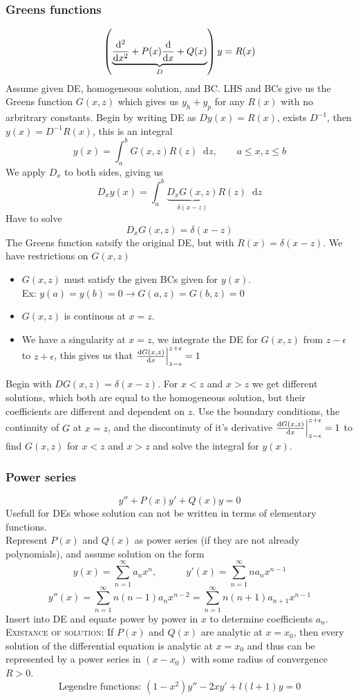 \documentclass[a4paper, 10pt]{article}
\newcommand*\diff{\mathop{}\!\mathrm{d}}
\begin{document}
\begin{multicols*}{3}
\subsubsection*{\small Greens functions}
$$ \left(\underbrace{\dv[2]{}{x} + P(x)\dv{}{x} + Q(x)}_{D}\right)y = R(x) $$
Assume given DE, homogeneous solution, and BC. LHS and BCs give us the Greens function $G(x,z)$ which gives us $y_h + y_p$ for any $R(x)$ with no arbritrary constants. Begin by writing DE as $Dy(x)=R(x)$, exists $D^{-1}$, then $y(x) = D^{-1}R(x)$, this is an integral $$y(x) = \int_a^b G(x,z)R(z)\diff z, \qquad a \leq x, z \leq b$$
We apply $D_x$ to both sides, giving us
$$D_xy(x) = \int_a^b \underbrace{D_xG(x,z)}_{\delta(x-z)}R(z)\diff z$$
Have to solve
$$ D_xG(x,z) = \delta(x-z)$$
The Greens function satsify the original DE, but with $R(x) = \delta(x-z)$. We have restrictions on $G(x,z)$
\begin{itemize}
  \item $G(x,z)$ must satisfy the given BCs given for $y(x)$.\\ Ex: $y(a)=y(b)=0 \rightarrow G(a,z) = G(b,z)=0$
  \item $G(x,z)$ is continous at $x=z$.
  \item We have a singularity at $x=z$, we integrate the DE for $G(x,z)$ from $z-\epsilon$ to $z+\epsilon$, this gives us that $\dv{G(x,z)}{x}\Big|_{z-\epsilon}^{z+\epsilon} = 1$
\end{itemize}
Begin with $DG(x,z)=\delta(x-z)$. For $x<z$ and $x>z$ we get different solutions, which both are equal to the homogeneous solution, but their coefficients are different and dependent on $z$. Use the boundary conditions, the continuity of $G$ at $x=z$, and the discontinuty of it's derivative $\dv{G(x,z)}{x}\Big|_{z-\epsilon}^{z+\epsilon} = 1$ to find $G(x,z)$ for $x<z$ and $x>z$ and solve the integral for $y(x)$.

\subsubsection*{\small Power series}
$$ y'' + P(x)y' + Q(x)y = 0$$
Usefull for DEs whose solution can not be written in terms of elementary functions. \\
Represent $P(x)$ and $Q(x)$ as power series (if they are not already polynomials), and assume solution on the form
$$ y(x) = \sum_{n=1}^{\infty} a_n x^n, \qquad \quad y'(x) = \sum_{n=1}^{\infty} na_n x^{n-1}$$ $$y''(x) = \sum_{n=1}^{\infty} n(n-1)a_n x^{n-2} = \sum_{n=1}^{\infty} n(n+1)a_{n+1} x^{n-1}$$
Insert into DE and equate power by power in $x$ to determine coefficients $a_n$.\\
\textsc{Existance of solution:} If $P(x)$ and $Q(x)$ are analytic at $x=x_0$, then every solution of the differential equation is analytic at $x=x_0$ and thus can be represented by a power series in $(x-x_0)$ with some radius of convergence $R>0$.
$$ \text{Legendre functions: } (1-x^2)y'' -2xy' + l(l+1)y = 0$$



\end{multicols*}
\end{document}
